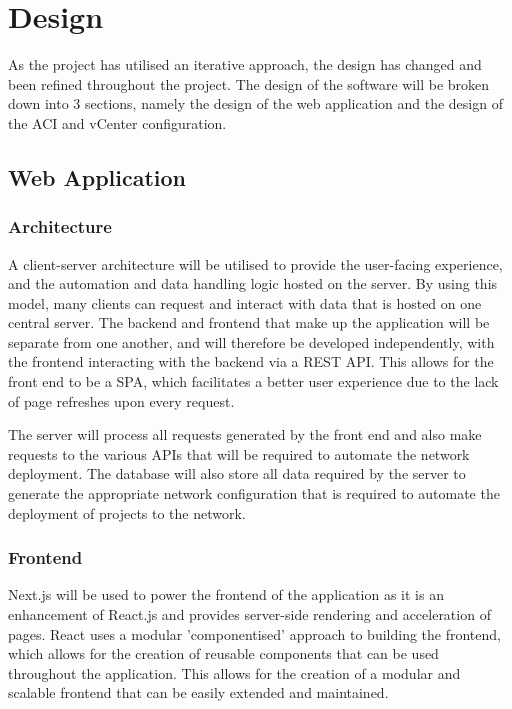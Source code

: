 \chapter{Design}
\label{chap:design}
As the project has utilised an iterative approach, the design has changed and been refined throughout the project. The design of the software will be broken down into 3 sections, namely the design of the web application and the design of the ACI and vCenter configuration.

\section{Web Application}
\label{design:web-application}
\subsection{Architecture}
\label{design:web-application:architecture}

A client-server architecture will be utilised to provide the user-facing experience, and the automation and data handling logic hosted on the server. By using this model, many clients can request and interact with data that is hosted on one central server. The backend and frontend that make up the application will be separate from one another, and will therefore be developed independently, with the frontend interacting with the backend via a REST API. This allows for the front end to be a SPA, which facilitates a better user experience due to the lack of page refreshes upon every request.

The server will process all requests generated by the front end and also make requests to the various APIs that will be required to automate the network deployment. The database will also store all data required by the server to generate the appropriate network configuration that is required to automate the deployment of projects to the network.

\subsection{Frontend}
\label{design:web-application:frontend}
Next.js will be used to power the frontend of the application as it is an enhancement of React.js and provides server-side rendering and acceleration of pages. React uses a modular 'componentised' approach to building the frontend, which allows for the creation of reusable components that can be used throughout the application. This allows for the creation of a modular and scalable frontend that can be easily extended and maintained.

